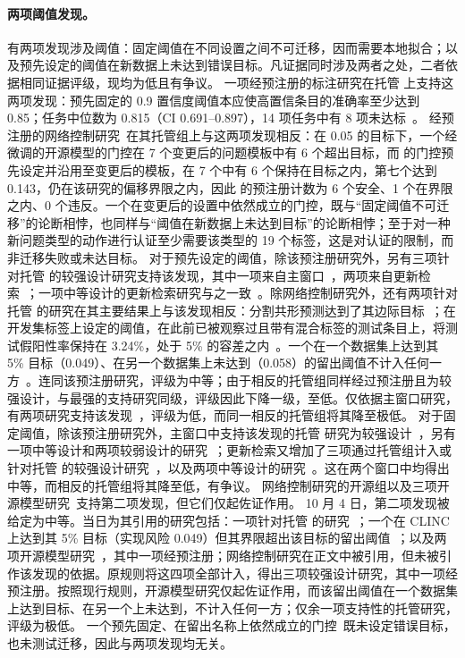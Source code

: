 \paragraph{两项阈值发现。}
有两项发现涉及阈值：固定阈值在不同设置之间不可迁移，因而需要本地拟合；以及预先设定的阈值在新数据上未达到错误目标。凡证据同时涉及两者之处，二者依据相同证据评级，现均为低且有争议。
一项经预注册的标注研究在托管 \jev{} 上支持这两项发现：预先固定的 0.9 置信度阈值本应使高置信条目的准确率至少达到 0.85；任务中位数为 0.815（CI 0.691--0.897），14 项任务中有 8 项未达标~\cite{arx24574}。
经预注册的网络控制研究~\cite{arx33689}在其托管组上与这两项发现相反：在 0.05 的目标下，一个经微调的开源模型的门控在 7 个变更后的问题模板中有 6 个超出目标，而 \jev{} 的门控预先设定并沿用至变更后的模板，在 7 个中有 6 个保持在目标之内，第七个达到 0.143，仍在该研究的偏移界限之内，因此 \jev{} 的预注册计数为 6 个安全、1 个在界限之内、0 个违反。一个在变更后的设置中依然成立的门控，既与“固定阈值不可迁移”的论断相悖，也同样与“阈值在新数据上未达到目标”的论断相悖；至于对一种新问题类型的动作进行认证至少需要该类型的 19 个标签，这是对认证的限制，而非迁移失败或未达目标。
对于预先设定的阈值，除该预注册研究外，另有三项针对托管 \jev{} 的较强设计研究支持该发现，其中一项来自主窗口~\cite{arx33401}，两项来自更新检索~\cite{arx03387,arx02267}；一项中等设计的更新检索研究与之一致~\cite{zen23050542}\zmark{}。除网络控制研究外，还有两项针对托管 \jev{} 的研究在其主要结果上与该发现相反：分割共形预测达到了其边际目标~\cite{zen22935043}\zmark{}；在开发集标签上设定的阈值，在此前已被观察过且带有混合标签的测试条目上，将测试假阳性率保持在 3.24\%，处于 5\% 的容差之内~\cite{zen23075657}\zmark{}。一个在一个数据集上达到其 5\% 目标（0.049）、在另一个数据集上未达到（0.058）的留出阈值不计入任何一方~\cite{arx00346}。连同该预注册研究，评级为中等；由于相反的托管组同样经过预注册且为较强设计，与最强的支持研究同级，评级因此下降一级，至低。仅依据主窗口研究，有两项研究支持该发现~\cite{arx33401,arx24574}，评级为低，而同一相反的托管组将其降至极低。
对于固定阈值，除该预注册研究外，主窗口中支持该发现的托管 \jev{} 研究为较强设计~\cite{arx29429,arx00346,arx01006,arx26550,arx39496,zen22952571}\zmark{}，另有一项中等设计和两项较弱设计的研究~\cite{arx27607,arx02046,jkf87_2026replication}\gmark{}；更新检索又增加了三项通过托管组计入或针对托管 \jev{} 的较强设计研究~\cite{arx03387,arx02267,zen22935043}\zmark{}，以及两项中等设计的研究~\cite{arx04985,zen23050542}\zmark{}。这在两个窗口中均得出中等，而相反的托管组将其降至低，有争议。
网络控制研究的开源组以及三项开源模型研究~\cite{arx33843,zen23041163,arx07177}\zmark{}支持第二项发现，但它们仅起佐证作用。
10 月 4 日，第二项发现被给定为中等。当日为其引用的研究包括：一项针对托管 \jev{} 的研究~\cite{arx33401}；一个在 CLINC 上达到其 5\% 目标（实现风险 0.049）但其界限超出该目标的留出阈值~\cite{arx00346}；以及两项开源模型研究~\cite{arx33843,zen23041163}\zmark{}，其中一项经预注册；网络控制研究在正文中被引用，但未被引作该发现的依据。原规则将这四项全部计入，得出三项较强设计研究，其中一项经预注册。按照现行规则，开源模型研究仅起佐证作用，而该留出阈值在一个数据集上达到目标、在另一个上未达到，不计入任何一方；仅余一项支持性的托管研究，评级为极低。
一个预先固定、在留出名称上依然成立的门控~\cite{zen23088660}\zmark{}既未设定错误目标，也未测试迁移，因此与两项发现均无关。


